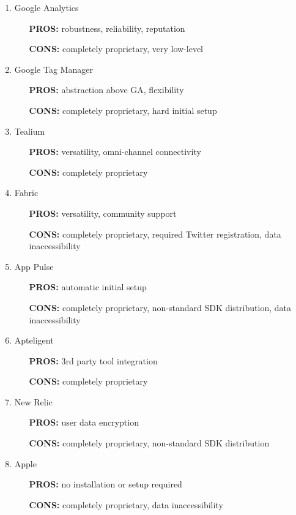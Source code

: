 \begin{enumerate}
	\item Google Analytics
		\begin{itemize}
			\item[{\bf PROS:}] robustness, reliability, reputation
			\item[{\bf CONS:}] completely proprietary, very low-level
		\end{itemize}
	\item Google Tag Manager
		\begin{itemize}
			\item[{\bf PROS:}] abstraction above GA, flexibility
			\item[{\bf CONS:}] completely proprietary, hard initial setup
		\end{itemize}
	\item Tealium
		\begin{itemize}
			\item[{\bf PROS:}] versatility, omni-channel connectivity
			\item[{\bf CONS:}] completely proprietary
		\end{itemize}
	\item Fabric
		\begin{itemize}
			\item[{\bf PROS:}] versatility, community support
			\item[{\bf CONS:}] completely proprietary, required Twitter registration, data inaccessibility
		\end{itemize}
	\item App Pulse
		\begin{itemize}
			\item[{\bf PROS:}] automatic initial setup
			\item[{\bf CONS:}] completely proprietary, non-standard SDK distribution, data inaccessibility
		\end{itemize}
	\item Apteligent
		\begin{itemize}
			\item[{\bf PROS:}] 3rd party tool integration
			\item[{\bf CONS:}] completely proprietary
		\end{itemize}
	\item New Relic
		\begin{itemize}
			\item[{\bf PROS:}] user data encryption
			\item[{\bf CONS:}] completely proprietary, non-standard SDK distribution
		\end{itemize}
	\item Apple
		\begin{itemize}
			\item[{\bf PROS:}] no installation or setup required
			\item[{\bf CONS:}] completely proprietary, data inaccessibility
		\end{itemize}
\end{enumerate}

